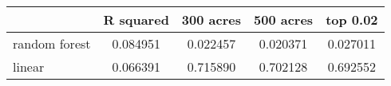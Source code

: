\begin{tabular}{lcccc}
\toprule
{} &  R squared &  300 acres &  500 acres &  top 0.02 \\
\midrule
random forest &   0.084951 &   0.022457 &   0.020371 &  0.027011 \\
linear        &   0.066391 &   0.715890 &   0.702128 &  0.692552 \\
\bottomrule
\end{tabular}
